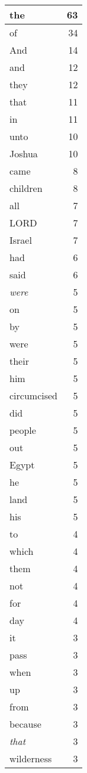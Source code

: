 \begin{center}
\begin{longtable}{l|r}
\hline \hline
\endlastfoot
the & 63 \\ \hline
of & 34 \\ \hline
And & 14 \\ \hline
and & 12 \\ \hline
they & 12 \\ \hline
that & 11 \\ \hline
in & 11 \\ \hline
unto & 10 \\ \hline
Joshua & 10 \\ \hline
came & 8 \\ \hline
children & 8 \\ \hline
all & 7 \\ \hline
LORD & 7 \\ \hline
Israel & 7 \\ \hline
had & 6 \\ \hline
said & 6 \\ \hline
\emph{were} & 5 \\ \hline
on & 5 \\ \hline
by & 5 \\ \hline
were & 5 \\ \hline
their & 5 \\ \hline
him & 5 \\ \hline
circumcised & 5 \\ \hline
did & 5 \\ \hline
people & 5 \\ \hline
out & 5 \\ \hline
Egypt & 5 \\ \hline
he & 5 \\ \hline
land & 5 \\ \hline
his & 5 \\ \hline
to & 4 \\ \hline
which & 4 \\ \hline
them & 4 \\ \hline
not & 4 \\ \hline
for & 4 \\ \hline
day & 4 \\ \hline
it & 3 \\ \hline
pass & 3 \\ \hline
when & 3 \\ \hline
up & 3 \\ \hline
from & 3 \\ \hline
because & 3 \\ \hline
\emph{that} & 3 \\ \hline
wilderness & 3 \\ \hline

\end{longtable}
\end{center}
